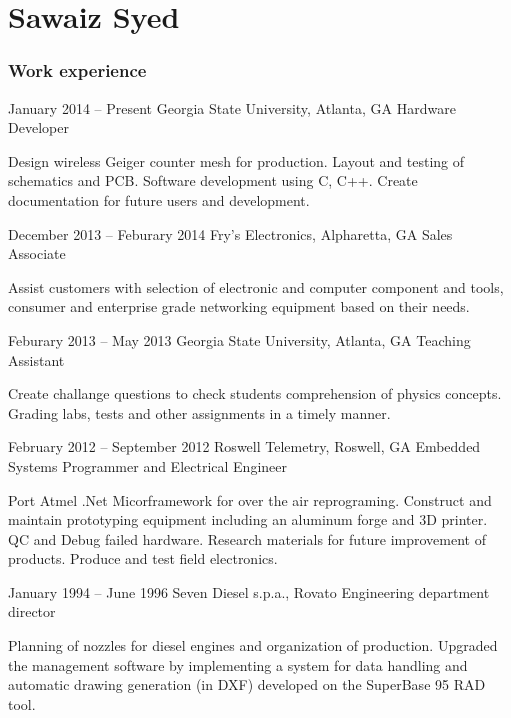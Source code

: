 \documentclass{tccv}
\begin{document}
\part{Sawaiz Syed}

\section{Work experience}

\begin{eventlist}

\item{January 2014 -- Present}
     {Georgia State University, Atlanta, GA}
     {Hardware Developer}
     
Design wireless Geiger counter mesh for production. Layout and testing of
schematics and PCB. Software development using C, C++. Create 
documentation for future users and development.

\item{December 2013 -- Feburary 2014}
     {Fry's Electronics, Alpharetta, GA}
     {Sales Associate}

Assist customers with selection of electronic and computer component and 
tools, consumer and enterprise grade networking equipment based on their needs.

\item{Feburary 2013 -- May 2013}
     {Georgia State University, Atlanta, GA}
     {Teaching Assistant}

Create challange questions to check students comprehension of physics 
concepts. Grading labs, tests and other assignments in a timely manner.

\item{February 2012 -- September 2012}
     {Roswell Telemetry, Roswell, GA}
     {Embedded Systems Programmer and Electrical Engineer}

Port Atmel .Net Micorframework for over the air reprograming. Construct 
and maintain prototyping equipment including an aluminum forge and 3D 
printer. QC and Debug failed hardware. Research materials for future 
improvement of products. Produce and test field electronics.

\item{January 1994 -- June 1996}
     {Seven Diesel s.p.a., Rovato}
     {Engineering department director}

Planning of nozzles for diesel engines and organization of production.
Upgraded the management software by implementing a system for data
handling and automatic drawing generation (in DXF) developed on the
SuperBase 95 RAD tool.

\end{eventlist}
\end{document}
